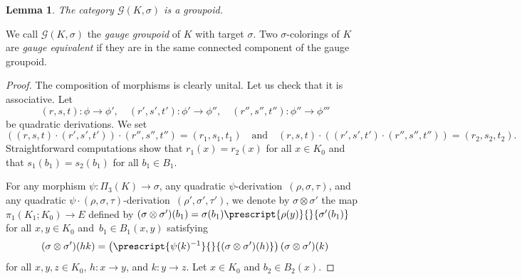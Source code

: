 \documentclass[a4paper, oneside]{amsart}
\numberwithin{equation}{subsection}
\theoremstyle{referencedlemma}
\theoremstyle{plain} %
\newtheorem{lem}[equation]{Lemma}
\theoremstyle{remark}
\begin{document}
\begin{lem}
The category $\mathcal{G}(K,\sigma)$ is a groupoid. 
\end{lem}

We call $\mathcal{G}(K,\sigma)$ the \emph{gauge groupoid} of $K$ with target $\sigma$.  Two $\sigma$-colorings of $K$ are \emph{gauge equivalent} if they are in the same connected component of the gauge groupoid. 

\begin{proof}
The composition of morphisms is clearly unital. Let us check that it is associative.  Let
$$
(r,s,t) \colon \phi \to \phi', \quad (r',s',t')\colon \phi' \to \phi'', \quad (r'',s'',t'') \colon \phi'' \to \phi'''
$$
be quadratic derivations. We set 
$$
((r,s,t)\cdot (r',s',t')) \cdot (r'',s'',t'') = (r_1, s_1, t_1)\quad\text{and} \quad
(r,s,t)\cdot ((r',s',t')\cdot (r'',s'',t'')) = (r_2, s_2, t_2).
$$
Straightforward computations show that $r_1(x) = r_2 (x)$ for all $x\in K_0$ and that $s_1(b_1) = s_2(b_1)$ for all $b_1\in B_1$.  

For any morphism $\psi \colon \Pi_3(K)\to \sigma$, any quadratic $\psi$-derivation~\mbox{$(\rho, \sigma, \tau)$}, and any quadratic \mbox{$\psi \cdot (\rho, \sigma, \tau)$-deri}\-vation~\mbox{$(\rho', \sigma', \tau')$}, we denote by $\sigma\otimes \sigma'$ the map $\pi_1(K_1; K_0) \to E$ defined by $(\sigma\otimes \sigma')(b_1) = \sigma(b_1) \prescript{\rho(y)}{}{\sigma'(b_1)}$ for all $x,y\in K_0$ and~$b_1 \in B_1(x,y)$ satisfying
$$
(\sigma\otimes \sigma')(hk) = \left(\prescript{\psi(k)^{-1}}{}{(\sigma\otimes\sigma')(h)}\right)(\sigma\otimes \sigma')(k)
$$
for all $x,y,z\in K_0$, $h\colon x\to y$, and $k \colon y \to z$. Let $x\in K_0$ and $b_2 \in B_2(x)$. 


\end{proof}
\end{document}
